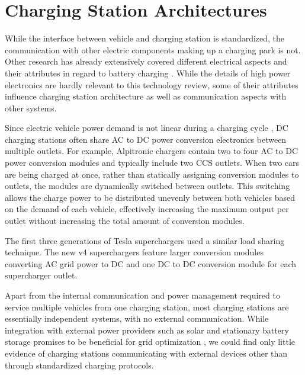 \documentclass[conference,flushend]{iaria} %
\begin{document}
\section{Charging Station Architectures} \label{sec:chargingstationarchitecture}
While the interface between vehicle and charging station is standardized, the communication with other electric components making up a charging park is not.
Other research has already extensively covered different electrical aspects and their attributes in regard to battery charging \cite{tu_extreme_2019, das_electric_2020, deb_review_2021}.
While the details of high power electronics are hardly relevant to this technology review, some of their attributes influence charging station architecture as well as communication aspects with other systems.

Since electric vehicle power demand is not linear during a charging cycle \cite{noauthor_audi_nodate}, DC charging stations often share AC to DC power conversion electronics between multiple outlets.
For example, Alpitronic chargers contain two to four AC to DC power conversion modules and typically include two CCS outlets.
When two cars are being charged at once, rather than statically assigning conversion modules to outlets, the modules are dynamically switched between outlets.
This switching allows the charge power to be distributed unevenly between both vehicles based on the demand of each vehicle, effectively increasing the maximum output per outlet without increasing the total amount of conversion modules.

The first three generations of Tesla superchargers used a similar load sharing technique.
The new v4 superchargers feature larger conversion modules converting AC grid power to DC and one DC to DC conversion module for each supercharger outlet.

Apart from the internal communication and power management required to service multiple vehicles from one charging station, most charging stations are essentially independent systems, with no external communication.
While integration with external power providers such as solar and stationary battery storage promises to be beneficial for grid optimization \cite{deb_review_2021}, we could find only little evidence of charging stations communicating with external devices other than through standardized charging protocols.

\iffalse
\end{document}
